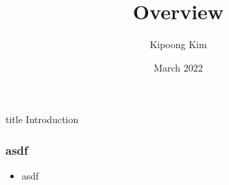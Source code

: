 \documentclass[11pt]{beamer}
\begin{document}
	\setlength{\leftmargini}{0pt}
	
	\author[Kipoong Kim]{Kipoong Kim} %
	
	
	\title[Cross]{
		Overview
	}
	
	\date[PostDoc-Intro]{March 2022}
	\begin{frame}[plain]
		\maketitle
	\end{frame}
	
	
	
	
	
	
	
	
	
	
	\begin{frame}
		\begin{beamercolorbox}[center]{title}
			{\huge Introduction}
		\end{beamercolorbox}
	\end{frame}




	
	
	\begin{frame}
		\frametitle{asdf}
		\begin{itemize}
			\setlength\itemsep{.3cm}
			\item asdf
		\end{itemize}
	\end{frame}
\end{document}
